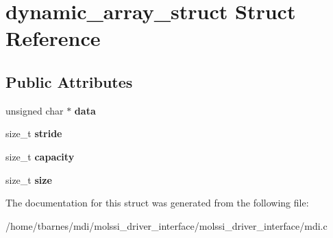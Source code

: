 \hypertarget{structdynamic__array__struct}{\section{dynamic\-\_\-array\-\_\-struct Struct Reference}
\label{structdynamic__array__struct}
}
\subsection*{Public Attributes}
\begin{DoxyCompactItemize}
\item 
\hypertarget{structdynamic__array__struct_acdf8715c6be1adbb6ab128b47290df75}{unsigned char $\ast$ {\bfseries data}}\label{structdynamic__array__struct_acdf8715c6be1adbb6ab128b47290df75}

\item 
\hypertarget{structdynamic__array__struct_a954737a27d8650b96e8a7167545fc87c}{size\-\_\-t {\bfseries stride}}\label{structdynamic__array__struct_a954737a27d8650b96e8a7167545fc87c}

\item 
\hypertarget{structdynamic__array__struct_a0c21af687047cf2776e01e0c051f8da7}{size\-\_\-t {\bfseries capacity}}\label{structdynamic__array__struct_a0c21af687047cf2776e01e0c051f8da7}

\item 
\hypertarget{structdynamic__array__struct_a4c9b2cb6c298d0c5e63458e47ed7fb8e}{size\-\_\-t {\bfseries size}}\label{structdynamic__array__struct_a4c9b2cb6c298d0c5e63458e47ed7fb8e}

\end{DoxyCompactItemize}


The documentation for this struct was generated from the following file\-:\begin{DoxyCompactItemize}
\item 
/home/tbarnes/mdi/molssi\-\_\-driver\-\_\-interface/molssi\-\_\-driver\-\_\-interface/mdi.\-c\end{DoxyCompactItemize}
